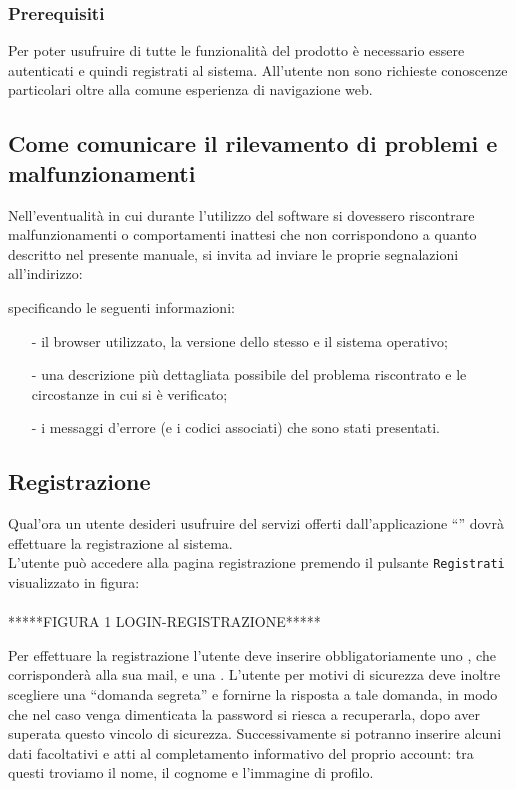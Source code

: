 \subsubsection{Prerequisiti}
Per poter usufruire di tutte le funzionalità del prodotto è necessario essere autenticati e quindi registrati al sistema.
All'utente non sono richieste conoscenze particolari oltre alla comune esperienza di navigazione web.

\subsection{Come comunicare il rilevamento di problemi e malfunzionamenti}
Nell'eventualità in cui durante l'utilizzo del software \caName{} si dovessero riscontrare malfunzionamenti o comportamenti inattesi che non corrispondono a quanto descritto nel presente manuale, si invita ad inviare le proprie segnalazioni all'indirizzo:
\begin{center}
  \email{}
\end{center}
specificando le seguenti informazioni:
\begin{itemize}[noitemsep,nolistsep]
  \item[-] il browser utilizzato, la versione dello stesso e il sistema operativo;
  \item[-] una descrizione più dettagliata possibile del problema riscontrato e le circostanze in cui si è verificato;
  \item[-] i messaggi d'errore (e i codici associati) che sono stati presentati.
\end{itemize}

\subsection{Registrazione}
Qual'ora un utente desideri usufruire del servizi offerti dall'applicazione ``\caName'' dovrà effettuare la registrazione al sistema.\\
L'utente può accedere alla pagina registrazione premendo il pulsante \texttt{Registrati} visualizzato in figura:
\\\\*****FIGURA 1 LOGIN-REGISTRAZIONE*****

Per effettuare la registrazione l'utente deve inserire obbligatoriamente uno \underline{}, che corrisponderà alla sua mail, e una .
L'utente per motivi di sicurezza deve inoltre scegliere una ``domanda segreta'' e fornirne la risposta a tale domanda, in modo che nel caso venga dimenticata la password si riesca a recuperarla, dopo aver superata questo vincolo di sicurezza.
Successivamente si potranno inserire alcuni dati facoltativi e atti al completamento informativo del proprio account: tra questi troviamo il nome, il cognome e l'immagine di profilo.

